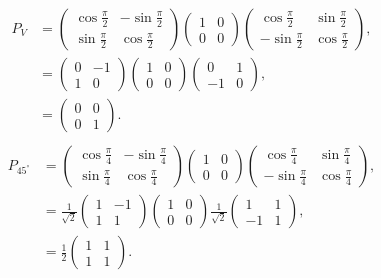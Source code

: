 \begin{align*}
P_{V}
&=
\begin{pmatrix}
  \cos{\frac{\pi}{2}} &-\sin{\frac{\pi}{2}}\\\sin{\frac{\pi}{2}}&\cos{\frac{\pi}{2}}
\end{pmatrix}
\begin{pmatrix}
1 & 0 \\0& 0
\end{pmatrix}
\begin{pmatrix}
  \cos{\frac{\pi}{2}} &\sin{\frac{\pi}{2}}\\-\sin{\frac{\pi}{2}}&\cos{\frac{\pi}{2}}
\end{pmatrix},\\
&=
\begin{pmatrix}
  0&-1\\1&0
\end{pmatrix}
\begin{pmatrix}
1 & 0 \\0& 0
\end{pmatrix}
\begin{pmatrix}
0 &1\\-1&0
\end{pmatrix},\\
&=
\begin{pmatrix}
0 &0\\0&1
\end{pmatrix}.\\
\end{align*}
\begin{align*}
P_{45^{\circ}}
&=
\begin{pmatrix}
  \cos{\frac{\pi}{4}} &-\sin{\frac{\pi}{4}}\\\sin{\frac{\pi}{4}}&\cos{\frac{\pi}{4}}
\end{pmatrix}
\begin{pmatrix}
1 & 0 \\0& 0
\end{pmatrix}
\begin{pmatrix}
  \cos{\frac{\pi}{4}} &\sin{\frac{\pi}{4}}\\-\sin{\frac{\pi}{4}}&\cos{\frac{\pi}{4}}
\end{pmatrix},\\
&=
\frac{1}{\sqrt{2}}
\begin{pmatrix}
  1&-1\\1&1
\end{pmatrix}
\begin{pmatrix}
1 & 0 \\0& 0
\end{pmatrix}
\frac{1}{\sqrt{2}}
\begin{pmatrix}
1 &1\\-1&1
\end{pmatrix},\\
&=
\frac{1}{2}
\begin{pmatrix}
1 &1\\1&1
\end{pmatrix}.\\
\end{align*}

